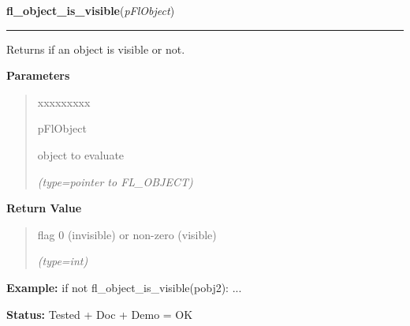 \hspace{.8\funcindent}\begin{boxedminipage}{\funcwidth}

    \raggedright \textbf{fl\_object\_is\_visible}(\textit{pFlObject})

    \vspace{-1.5ex}

    \rule{\textwidth}{0.5\fboxrule}
\setlength{\parskip}{2ex}
    Returns if an object is visible or not.

\setlength{\parskip}{1ex}
      \textbf{Parameters}
      \vspace{-1ex}

      \begin{quote}
        \begin{Ventry}{xxxxxxxxx}

          \item[pFlObject]

          object to evaluate

            {\it (type=pointer to FL\_OBJECT)}

        \end{Ventry}

      \end{quote}

      \textbf{Return Value}
    \vspace{-1ex}

      \begin{quote}
      flag 0 (invisible) or non-zero (visible)

      {\it (type=int)}

      \end{quote}

\textbf{Example:} if not fl\_object\_is\_visible(pobj2): ...



\textbf{Status:} Tested + Doc + Demo = OK



    \end{boxedminipage}

    \label{xformslib:flbasic:fl_free_object}

    \vspace{0.5ex}

